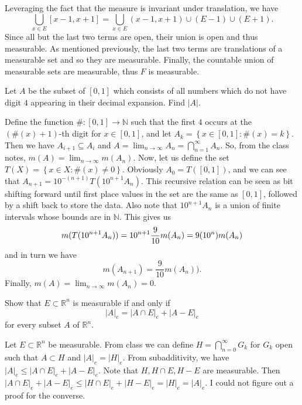 \begin{solution}
  Leveraging the fact that the measure is invariant under translation, we have
  \[
    \bigcup_{x \in E}[x-1,x+1] = \bigcup_{x \in E} (x-1,x+1) \cup (E - 1) \cup (E+1)
  .\] 
  Since all but the last two terms are open, their union is open and thus measurable.
  As mentioned previously, the last two terms are translations of a measurable set and so they are measurable.
  Finally, the countable union of measurable sets are measurable, thus $F$ is measurable.
\end{solution}

\pagebreak

\begin{problem}{5}
Let $A$ be the subset of $\left[ 0,1 \right]$ which consists of all numbers which do not have digit $4$ appearing in their decimal expansion.
Find $\left| A \right|$.
\end{problem}

\begin{solution}
  Define the function $\# : [0,1] \to \mathbb{N} $ such that the first $4$ occurs at the $(\#(x)+1)$-th digit for $x \in [0,1]$, and let $A_{k} = \left\{ x\in[0,1] : \#(x) = k \right\}$.
  Then we have $A_{i+1} \subseteq A_{i}$ and $A = \lim_{n \to \infty} A_{n} = \bigcap_{n=1}^{ \infty } A_{n} $.
  So, from the class notes, $m(A) = \lim_{n \to \infty} m(A_{n})$.
  Now, let us define the set $T(X) = \left\{ x \in X : \#(x) \neq  0  \right\}$. 
  Obviously $A_{0} = T([0,1])$, and we can see that $A_{n+1} = 10^{-(n+1)}T(10^{n+1}A_{n})$.
  This recursive relation can be seen as bit shifting forward until first place values in the set are the same as $[0,1]$, followed by a shift back to store the data.
  Also note that $10^{n+1}A_{n}$ is a union of finite intervals whose bounds are in $\mathbb{N}$.
  This gives us
  \[
  m(T(10^{n+1}A_{n})) = 10^{n+1} \frac{9}{10} m(A_{n}) = 9(10^{n})m(A_{n}) \\
  \] 
  and in turn we have
  \[
  m(A_{n+1}) = \frac{9}{10}m(A_{n}))
  .\] 
  Finally, $m(A) = \lim_{n \to \infty} m(A_{n}) = 0$.

\end{solution}

\pagebreak

\begin{problem}{6}
Show that $E \subset \mathbb{R}^{n}$ is measurable if and only if 
\[
\left| A \right|_{e } = \left| A \cap E  \right|_{e} + \left| A - E  \right|_{e}
\] 
for every subset $A$ of $\mathbb{R}^{n}$.
\end{problem}
\begin{solution}
  Let $E \subset \mathbb{R}^{n}$ be measurable.
  From class we can define $H = \bigcap_{n=0}^{\infty} G_{k}$ for $G_{k}$ open such that $A \subset H$ and $\left| A \right|_{e} = \left| H \right|_{e}$.
  From subadditivity, we have $\left| A \right|_{e} \leq  \left| A \cap E \right|_{e} + \left| A - E \right|_{e}$.
  Note that $H,H\cap E,H - E$ are measurable.
  Then $\left| A \cap E \right|_{e} + \left| A - E \right|_{e} \leq \left| H \cap E \right|_{e} + \left| H - E \right|_{e} = \left| H \right|_{e} = \left| A \right|_{e}$.
  I could not figure out a proof for the converse.
\end{solution}
